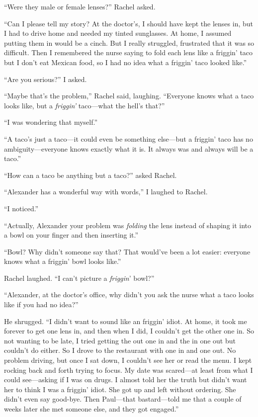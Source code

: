 ``Were they male or female lenses?'' Rachel asked.

``Can I please tell my story? At the doctor's, I should have kept the
lenses in, but I had to drive home and needed my tinted sunglasses. At
home, I assumed putting them in would be a cinch. But I really
struggled, frustrated that it was so difficult. Then I remembered the
nurse saying to fold each lens like a friggin' taco but I don't eat
Mexican food, so I had no idea what a friggin' taco looked like.''

``Are you serious?'' I asked.

``Maybe that's the problem,'' Rachel said, laughing. ``Everyone knows
what a taco looks like, but a \emph{friggin'} taco---what the hell's
that?''

``I was wondering that myself.''

``A taco's just a taco---it could even be something else---but a
friggin' taco has no ambiguity---everyone knows exactly what it is. It
always was and always will be a taco.''

``How can a taco be anything but a taco?'' asked Rachel.

``Alexander has a wonderful way with words,'' I laughed to Rachel.

``I noticed.''

``Actually, Alexander your problem was \emph{folding} the lens instead
of shaping it into a bowl on your finger and then inserting it.''

``Bowl? Why didn't someone say that? That would've been a lot easier:
everyone knows what a friggin' bowl looks like.''

Rachel laughed. ``I can't picture a \emph{friggin}' bowl?''

``Alexander, at the doctor's office, why didn't you ask the nurse what a
taco looks like if you had no idea?''

He shrugged. ``I didn't want to sound like an friggin' idiot. At home,
it took me forever to get one lens in, and then when I did, I couldn't
get the other one in. So not wanting to be late, I tried getting the out
one in and the in one out but couldn't do either. So I drove to the
restaurant with one in and one out. No problem driving, but once I sat
down, I couldn't see her or read the menu. I kept rocking back and forth
trying to focus. My date was scared---at least from what I could
see---asking if I was on drugs. I almost told her the truth but didn't
want her to think I was a friggin' idiot. She got up and left without
ordering. She didn't even say good-bye. Then Paul---that bastard---told
me that a couple of weeks later she met someone else, and they got
engaged.''

